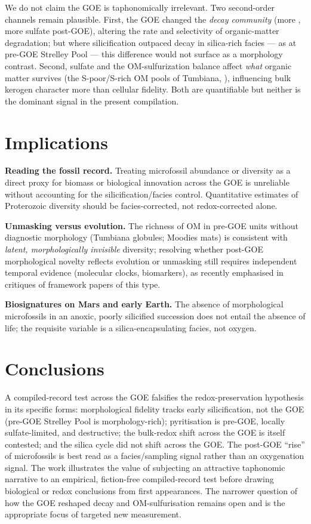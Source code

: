 \documentclass[11pt]{article}
\begin{document}
We do not claim the GOE is taphonomically irrelevant. Two second-order channels remain plausible.
First, the GOE changed the \emph{decay community} (more , more sulfate post-GOE), altering
the rate and selectivity of organic-matter degradation; but where silicification outpaced decay
in silica-rich facies --- as at pre-GOE Strelley Pool --- this difference would not surface as a
morphology contrast. Second, sulfate and the OM-sulfurization balance affect \emph{what} organic
matter survives (the S-poor/S-rich OM pools of Tumbiana, \citealp{Lepot2009}), influencing bulk
kerogen character more than cellular fidelity. Both are quantifiable but neither is the dominant
signal in the present compilation.

\section{Implications}

\textbf{Reading the fossil record.} Treating microfossil abundance or diversity as a direct proxy
for biomass or biological innovation across the GOE is unreliable without accounting for the
silicification/facies control. Quantitative estimates of Proterozoic diversity should be
facies-corrected, not redox-corrected alone.

\textbf{Unmasking versus evolution.} The richness of OM in pre-GOE units without diagnostic
morphology (Tumbiana globules; Moodies mats) is consistent with \emph{latent, morphologically
invisible} diversity; resolving whether post-GOE morphological novelty reflects evolution or
unmasking still requires independent temporal evidence (molecular clocks, biomarkers), as recently
emphasised in critiques of framework papers of this type.

\textbf{Biosignatures on Mars and early Earth.} The absence of morphological microfossils in an
anoxic, poorly silicified succession does not entail the absence of life; the requisite variable
is a silica-encapsulating facies, not oxygen.

\section{Conclusions}

A compiled-record test across the GOE falsifies the redox-preservation hypothesis in its specific
forms: morphological fidelity tracks early silicification, not the GOE (pre-GOE Strelley Pool is
morphology-rich); pyritisation is pre-GOE, locally sulfate-limited, and destructive; the bulk-redox
shift across the GOE is itself contested; and the silica cycle did not shift across the GOE. The
post-GOE ``rise'' of microfossils is best read as a facies/sampling signal rather than an
oxygenation signal. The work illustrates the value of subjecting an attractive taphonomic narrative
to an empirical, fiction-free compiled-record test before drawing biological or redox conclusions
from first appearances. The narrower question of how the GOE reshaped decay and OM-sulfurisation
remains open and is the appropriate focus of targeted new measurement.
\end{document}
